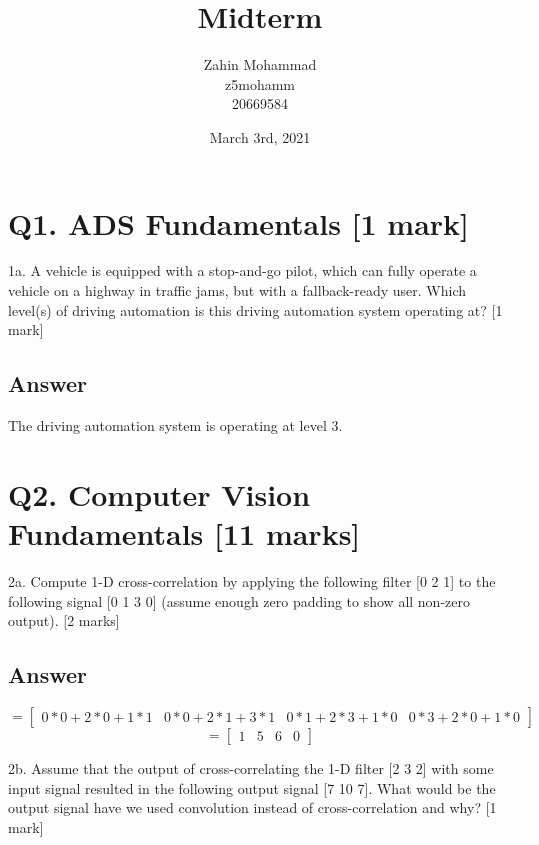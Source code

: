 \documentclass[
	12pt, %
]{fphw}
\title{Midterm} %
\author{Zahin Mohammad \\ z5mohamm \\ 20669584} %
\date{March 3rd, 2021} %
\institute{University of Waterloo} %
\begin{document}
\maketitle %
\section*{Q1. ADS Fundamentals [1 mark]}
\begin{problem}
1a. A vehicle is equipped with a stop-and-go pilot, which can fully operate a vehicle on a
highway in traffic jams, but with a fallback-ready user. Which level(s) of driving
automation is this driving automation system operating at? [1 mark]
\end{problem}
\subsection*{Answer}
The driving automation system is operating at level 3.
\section*{Q2. Computer Vision Fundamentals [11 marks]}
\begin{problem}
2a. Compute 1-D cross-correlation by applying the following filter [0 2 1] to the
following signal [0 1 3 0] (assume enough zero padding to show all non-zero output). [2
		marks]
\end{problem}
\subsection*{Answer}
\[
=
  \begin{bmatrix}
    0*0+2*0+1*1 & 0*0+2*1+3*1 & 0*1+2*3+1*0 & 0*3+2*0+1*0
  \end{bmatrix}
\]
\[
=
  \begin{bmatrix}
    1 & 5 & 6 & 0
  \end{bmatrix}
\]
\begin{problem}
2b. Assume that the output of cross-correlating the 1-D filter [2 3 2] with some input
signal resulted in the following output signal [7 10 7]. What would be the output signal
have we used convolution instead of cross-correlation and why? [1 mark]
\end{problem}
\end{document}
